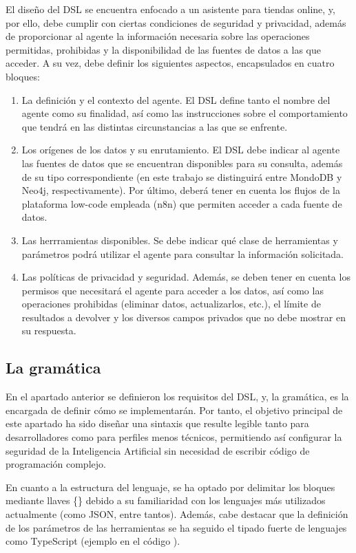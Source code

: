 \documentclass[12pt,twoside,titlepage]{report}
\begin{document}
El diseño del DSL se encuentra enfocado a un asistente para tiendas online, y, por ello, debe cumplir con ciertas condiciones de seguridad y privacidad, además de proporcionar al agente la información necesaria sobre las operaciones permitidas, prohibidas y la disponibilidad de las fuentes de datos a las que acceder. A su vez, debe definir los siguientes aspectos, encapsulados en cuatro bloques:
\begin{enumerate}
  \item La definición y el contexto del agente. El DSL define tanto el nombre del agente como su finalidad, así como las instrucciones sobre el comportamiento que tendrá en las distintas circunstancias a las que se enfrente.
  \item Los orígenes de los datos y su enrutamiento. El DSL debe indicar al agente las fuentes de datos que se encuentran disponibles para su consulta, además de su tipo correspondiente (en este trabajo se distinguirá entre MondoDB y Neo4j, respectivamente). Por último, deberá tener en cuenta los flujos de la plataforma low-code empleada (n8n) que permiten acceder a cada fuente de datos.
  \item Las herrramientas disponibles. Se debe indicar qué clase de herramientas y parámetros podrá utilizar el agente para consultar la información solicitada.
  \item Las políticas de privacidad y seguridad. Además, se deben tener en cuenta los permisos que necesitará el agente para acceder a los datos, así como las operaciones prohibidas (eliminar datos, actualizarlos, etc.), el límite de resultados a devolver y los diversos campos privados que no debe mostrar en su respuesta. 
\end{enumerate}

\subsection{La gramática}

En el apartado anterior se definieron los requisitos del DSL, y, la gramática, es la encargada de definir cómo se implementarán. Por tanto, el objetivo principal de este apartado ha sido diseñar una sintaxis que resulte legible tanto para desarrolladores como para perfiles menos técnicos, permitiendo así configurar la seguridad de la Inteligencia Artificial sin necesidad de escribir código de programación complejo.

En cuanto a la estructura del lenguaje, se ha optado por delimitar los bloques mediante llaves \{\} debido a su familiaridad con los lenguajes más utilizados actualmente (como JSON, entre tantos). Además, cabe destacar que la definición de los parámetros de las herramientas se ha seguido el tipado fuerte de lenguajes como TypeScript (ejemplo en el código ).
\end{document}
